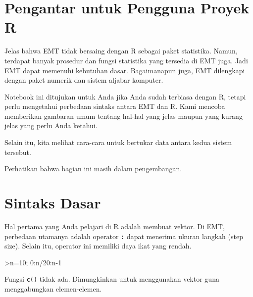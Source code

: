 \documentclass[a4paper,11pt,oneside,enabledeprecatedfontcommands]{scrbook}
\newenvironment{eulernotebook}{}{}
\newcommand{\eulerheading}[1]{\chapter{#1}}
\newenvironment{eulercomment}{\par\medskip\noindent}{\par\medskip}
\begin{document}
\begin{eulernotebook}
		\eulerheading{Pengantar untuk Pengguna Proyek R}
		\begin{eulercomment}
			Jelas bahwa EMT tidak bersaing dengan R sebagai paket statistika. Namun, terdapat banyak prosedur dan
			fungsi statistika yang tersedia di EMT juga. Jadi EMT dapat memenuhi kebutuhan dasar. Bagaimanapun
			juga, EMT dilengkapi dengan paket numerik dan sistem aljabar komputer.
			
			Notebook ini ditujukan untuk Anda jika Anda sudah terbiasa dengan R, tetapi perlu mengetahui
			perbedaan sintaks antara EMT dan R. Kami mencoba memberikan gambaran umum tentang hal-hal yang jelas
			maupun yang kurang jelas yang perlu Anda ketahui.
			
			Selain itu, kita melihat cara-cara untuk bertukar data antara kedua sistem tersebut.
			
			Perhatikan bahwa bagian ini masih dalam pengembangan.
		\end{eulercomment}
		
		\eulerheading{Sintaks Dasar}
		\begin{eulercomment}
			Hal pertama yang Anda pelajari di R adalah membuat vektor. Di EMT, perbedaan utamanya adalah operator
			\texttt{:} dapat menerima ukuran langkah (step size). Selain itu, operator ini memiliki daya ikat yang rendah.
		\end{eulercomment}
		\begin{eulerprompt}
			>n=10; 0:n/20:n-1
		\end{eulerprompt}
		\begin{euleroutput}
			[0,  0.5,  1,  1.5,  2,  2.5,  3,  3.5,  4,  4.5,  5,  5.5,  6,  6.5,  7,  7.5,  8,  8.5,  9]
		\end{euleroutput}
		\begin{eulercomment}
			Fungsi \texttt{c()} tidak ada. Dimungkinkan untuk menggunakan vektor guna menggabungkan elemen-elemen.
			

\end{eulercomment}
\end{eulernotebook}
\end{document}
